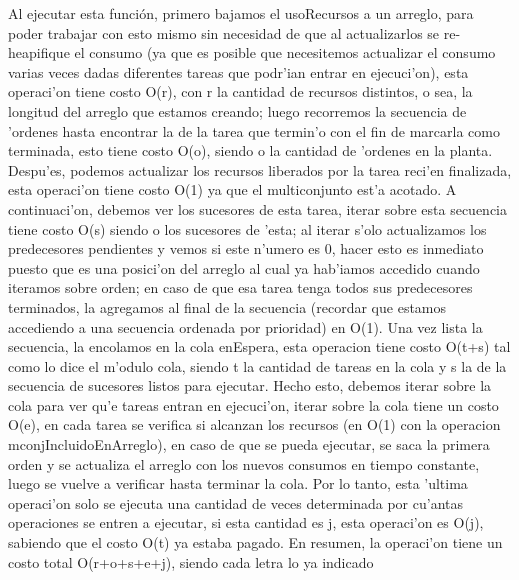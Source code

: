 \documentclass[a4paper,10pt]{article}
\begin{document}
\begin{algoritmo}
Al ejecutar esta función, primero bajamos el usoRecursos a un arreglo, para poder trabajar con esto mismo sin necesidad de que al actualizarlos se re-heapifique el consumo (ya que es posible que necesitemos actualizar el consumo varias veces dadas diferentes tareas que podr'ian entrar en ejecuci'on), esta operaci'on tiene costo O(r), con r la cantidad de recursos distintos, o sea, la longitud del arreglo que estamos creando; luego recorremos la secuencia de 'ordenes hasta encontrar la de la tarea que termin'o con el fin de marcarla como terminada, esto tiene costo O(o), siendo o la cantidad de 'ordenes en la planta. Despu'es, podemos actualizar los recursos liberados por la tarea reci'en finalizada, esta operaci'on tiene costo O(1) ya que el multiconjunto est'a acotado. A continuaci'on, debemos ver los sucesores de esta tarea, iterar sobre esta secuencia tiene costo O(s) siendo o los sucesores de 'esta; al iterar s'olo actualizamos los predecesores pendientes y vemos si este n'umero es 0, hacer esto es inmediato puesto que es una posici'on del arreglo al cual ya hab'iamos accedido cuando iteramos sobre orden; en caso de que esa tarea tenga todos sus predecesores terminados, la agregamos al final de la secuencia (recordar que estamos accediendo a una secuencia ordenada por prioridad) en O(1). Una vez lista la secuencia, la encolamos en la cola enEspera, esta operacion tiene costo O(t+s) tal como lo dice el m'odulo cola, siendo t la cantidad de tareas en la cola y s la de la secuencia de sucesores listos para ejecutar.
Hecho esto, debemos iterar sobre la cola para ver qu'e tareas entran en ejecuci'on, iterar sobre la cola tiene un costo O(e), en cada tarea se verifica si alcanzan los recursos (en O(1) con la operacion mconjIncluidoEnArreglo), en caso de que se pueda ejecutar, se saca la primera orden y se actualiza el arreglo con los nuevos consumos en tiempo constante, luego se vuelve a verificar hasta terminar la cola. Por lo tanto, esta 'ultima operaci'on solo se ejecuta una cantidad de veces determinada por cu'antas operaciones se entren a ejecutar, si esta cantidad es j, esta operaci'on es O(j), sabiendo que el costo O(t) ya estaba pagado. En resumen, la operaci'on tiene un costo total O(r+o+s+e+j), siendo cada letra lo ya indicado

\end{algoritmo}

\newpage
\end{document}
